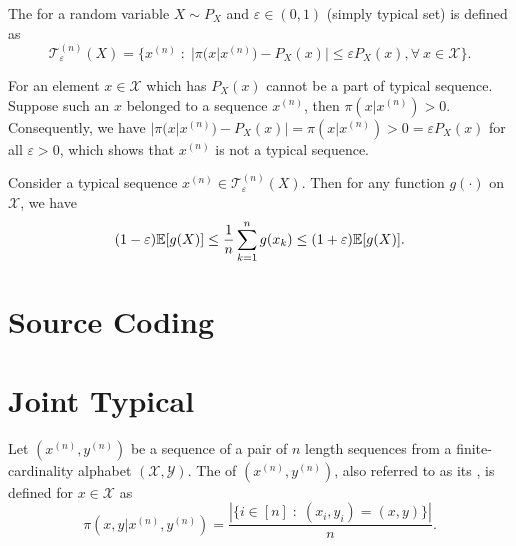 \documentclass[11pt,a4paper]{article}
\begin{document}
\begin{definition}
    The  for a random variable $X\sim P_X$ and $\varepsilon \in (0,1)$ (simply typical set) is defined as
    \begin{equation*}
        \mathcal{T}^{(n)}_\varepsilon (X) = \{x^{(n)}\;:\; |\pi(x|x^{(n)}) - P_X(x)| \le \varepsilon P_X(x), \forall\ x\in\mathcal{X}\}.
    \end{equation*}
\end{definition}

\begin{remark}
    For an element $x\in\mathcal{X}$ which has $P_X(x)$ cannot be a part of typical sequence. Suppose such an $x$ belonged to a sequence $x^{(n)}$, then $\pi(x|x^{(n)}) > 0$. Consequently, we have $|\pi(x|x^{(n)}) - P_X(x)| = \pi(x|x^{(n)}) > 0 = \varepsilon P_X(x)$ for all $\varepsilon > 0$, which shows that $x^{(n)}$ is not a typical sequence.
\end{remark}

\begin{lemma}
    Consider a typical sequence $x^{(n)}\in \mathcal{T}^{(n)}_\varepsilon (X)$. Then for any  function $g(\cdot)$ on $\mathcal{X}$, we have 
    \begin{equation*}
        (1-\varepsilon) \mathbb{E}[g(X)] \le \dfrac{1}{n} \sum_{k=1}^{n} g(x_k) \le (1+\varepsilon) \mathbb{E}[g(X)].
    \end{equation*}
\end{lemma}


\section{Source Coding}

\section{Joint Typical}

\begin{definition}
    Let $(x^{(n)}, y^{(n)})$ be a sequence of a pair of $n$ length sequences from a finite-cardinality alphabet $(\mathcal{X},\mathcal{Y})$. The  of $(x^{(n)}, y^{(n)})$, also referred to as its , is defined for $x\in \mathcal{X}$ as
    \begin{equation*}
        \pi(x,y|x^{(n)}, y^{(n)}) = \dfrac{|\{i\in [n]\;:\;(x_i,y_i) = (x,y)\}|}{n}.
    \end{equation*}
\end{definition}
\end{document}
